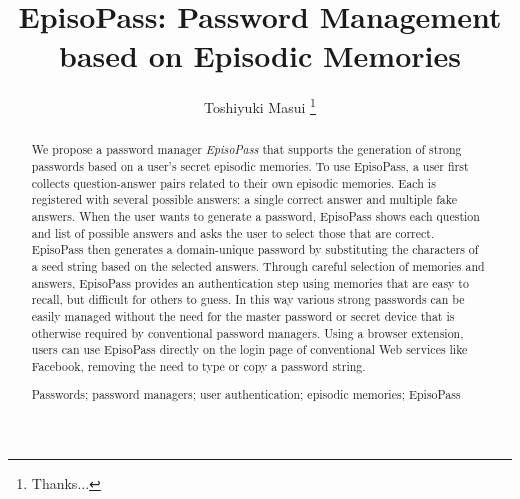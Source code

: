 \documentclass[runningheads,a4paper]{llncs}
\newcommand{\keywords}[1]{\par\addvspace\baselineskip
\noindent\keywordname\enspace\ignorespaces#1}
\begin{document}
\mainmatter  %

\title{EpisoPass: Password Management based on Episodic Memories}


%
%
\author{Toshiyuki Masui%
\thanks{Thanks...}%
}
%


%
%

\maketitle


\begin{abstract}
We propose a password manager \textit{EpisoPass} that supports the
generation of strong passwords based on a user's secret episodic
memories. To use EpisoPass, a user first collects question-answer
pairs related to their own episodic memories. Each is registered with
several possible answers: a single correct answer and multiple fake
answers. When the user wants to generate a password, EpisoPass shows
each question and list of possible answers and asks the user to select
those that are correct. EpisoPass then generates a domain-unique
password by substituting the characters of a seed string based on the
selected answers. Through careful selection of memories and answers,
EpisoPass provides an authentication step using memories that are easy
to recall, but difficult for others to guess. In this way various
strong passwords can be easily managed without the need for the master
password or secret device that is otherwise required by conventional
password managers. Using a browser extension, users can use EpisoPass
directly on the login page of conventional Web services like Facebook,
removing the need to type or copy a password string.

\keywords{Passwords; password managers; user authentication; episodic memories; EpisoPass}
\end{abstract}
\end{document}
